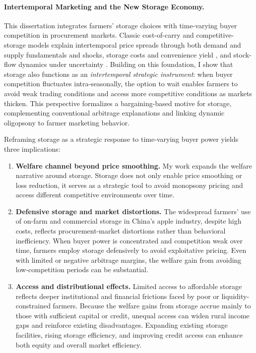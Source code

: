 \paragraph{Intertemporal Marketing and the New Storage Economy.}
This dissertation integrates farmers' storage choices with time-varying buyer competition in procurement markets. Classic cost-of-carry and competitive-storage models explain intertemporal price spreads through both demand and supply fundamentals and shocks, storage costs and convenience yield \citep{working1949theory,wright1982econ,williams1991storage}, and stock-flow dynamics under uncertainty \citep{gustafson1958implications,deaton1992behaviour}. Building on this foundation, I show that storage also functions as an \emph{intertemporal strategic instrument}: when buyer competition fluctuates intra-seasonally, the option to wait enables farmers to avoid weak trading conditions and access more competitive conditions as markets thicken. This perspective formalizes a bargaining-based motive for storage, complementing conventional arbitrage explanations and linking dynamic oligopsony to farmer marketing behavior.


Reframing storage as a strategic response to time-varying buyer power yields three implications:
\begin{enumerate}
    \item \textbf{Welfare channel beyond price smoothing.} My work expands the welfare narrative around storage. Storage does not only enable price smoothing or loss reduction, it serves as a strategic tool to avoid monopsony pricing and access different competitive environments over time. 

    \item \textbf{Defensive storage and market distortions.} The widespread farmers' use of on-farm and commercial storage in China's apple industry, despite high costs, reflects procurement-market distortions rather than behavioral inefficiency. When buyer power is concentrated and competition weak over time, farmers employ storage defensively to avoid exploitative pricing. Even with limited or negative arbitrage margins, the welfare gain from avoiding low-competition periods can be substantial.  

    \item \textbf{Access and distributional effects.} Limited access to affordable storage reflects deeper institutional and financial frictions faced by poor or liquidity-constrained farmers. Because the welfare gains from storage accrue mainly to those with sufficient capital or credit, unequal access can widen rural income gaps and reinforce existing disadvantages. Expanding existing storage facilities, rising storage efficiency, and improving credit access can enhance both equity and overall market efficiency.
\end{enumerate}




